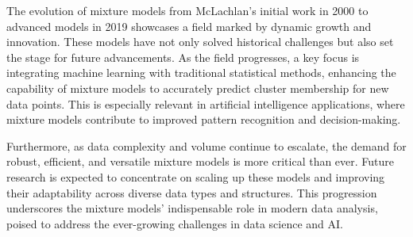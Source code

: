 \documentclass{article}
\begin{document}
The evolution of mixture models from McLachlan's initial work in 2000 to advanced models in 2019 showcases a field marked by dynamic growth and innovation. These models have not only solved historical challenges but also set the stage for future advancements. As the field progresses, a key focus is integrating machine learning with traditional statistical methods, enhancing the capability of mixture models to accurately predict cluster membership for new data points. This is especially relevant in artificial intelligence applications, where mixture models contribute to improved pattern recognition and decision-making.

Furthermore, as data complexity and volume continue to escalate, the demand for robust, efficient, and versatile mixture models is more critical than ever. Future research is expected to concentrate on scaling up these models and improving their adaptability across diverse data types and structures. This progression underscores the mixture models' indispensable role in modern data analysis, poised to address the ever-growing challenges in data science and AI.

\printbibliography
\end{document}
